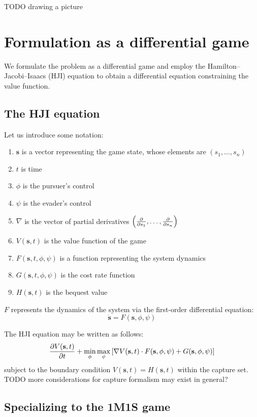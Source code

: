 \documentclass{article}
\renewcommand{\vec}[1]{\mathbf{#1}}
\begin{document}
TODO drawing a picture

\section{Formulation as a differential game}

We formulate the problem as a differential game and employ the
Hamilton--Jacobi--Isaacs (HJI) equation to obtain a differential equation constraining
the value function.

\subsection{The HJI equation}

Let us introduce some notation:
\begin{enumerate}
\item $\vec{s}$ is a vector representing the game state, whose elements are
$(s_1, \dots, s_n)$
\item $t$ is time
\item $\phi$ is the pursuer's control
\item $\psi$ is the evader's control
\item $\nabla$ is the vector of partial derivatives $\left(\pdv{}{s_1}, \dots,
\pdv{}{s_n}\right)$
\item $V(\vec{s}, t)$ is the value function of the game
\item $F(\vec{s}, t, \phi, \psi)$ is a function representing the system dynamics
\item $G(\vec{s}, t, \phi, \psi)$ is the cost rate function
\item $H(\vec{s}, t)$ is the bequest value
\end{enumerate}

$F$ represents the dynamics of the system via the first-order differential
equation:
\begin{equation}
\dot{\vec{s}} = F(\vec{s}, \phi, \psi)
\end{equation}

The HJI equation may be written as follows:
\begin{align}
\pdv{V(\vec{s}, t)}{t} + \min_{\phi} \max_{\psi} \left[
  \nabla V(\vec{s}, t) \cdot F(\vec{s}, \phi, \psi) + G(\vec{s}, \phi, \psi)
\right]
\end{align}
subject to the boundary condition $V(\vec{s}, t) = H(\vec{s}, t)$ within the
capture set.
TODO more considerations for capture formalism may exist in general?

\subsection{Specializing to the 1M1S game}
\end{document}
